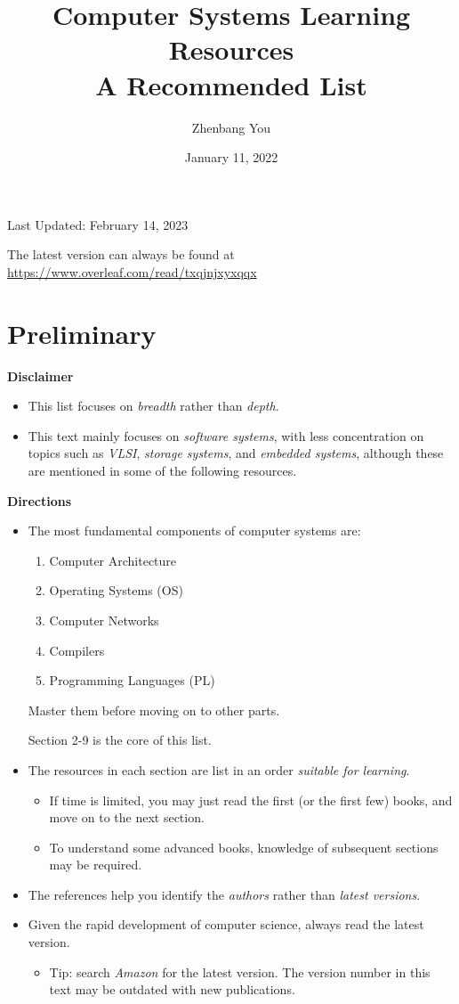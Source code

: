 \documentclass{article}
\title{\Huge{Computer Systems Learning Resources}\\ \huge{A Recommended List}}
\author{Zhenbang You}
\date{January 11, 2022}
\begin{document}
\maketitle

\centerline{\large{Last Updated: February 14, 2023}}

\vspace{20pt}

The latest version can always be found at \href{https://www.overleaf.com/read/txqjnjxyxqqx}{https://www.overleaf.com/read/txqjnjxyxqqx}

\section{Preliminary}

\textbf{Disclaimer}
\begin{itemize}
    \item This list focuses on \emph{breadth} rather than \emph{depth}.
    \item This text mainly focuses on \emph{software systems}, with less concentration on topics such as \emph{VLSI}, \emph{storage systems}, and \emph{embedded systems}, although these are mentioned in some of the following resources.
\end{itemize}

\noindent
\textbf{Directions}
\begin{itemize}
    \item The most fundamental components of computer systems are:
    \begin{enumerate}
        \item Computer Architecture
        \item Operating Systems (OS)
        \item Computer Networks
        \item Compilers
        \item Programming Languages (PL)
    \end{enumerate}
    Master them before moving on to other parts.
    
    Section 2-9 is the core of this list.
    \item The resources in each section are list in an order \emph{suitable for learning}.
    \begin{itemize}
        \item If time is limited, you may just read the first (or the first few) books, and move on to the next section.
        \item To understand some advanced books, knowledge of subsequent sections may be required.
    \end{itemize}
    \item The references help you identify the \emph{authors} rather than \emph{latest versions}.
    \item Given the rapid development of computer science, always read the latest version.
    \begin{itemize}
        \item Tip: search \emph{Amazon} for the latest version. The version number in this text may be outdated with new publications.
    \end{itemize}
\end{itemize}
\end{document}
